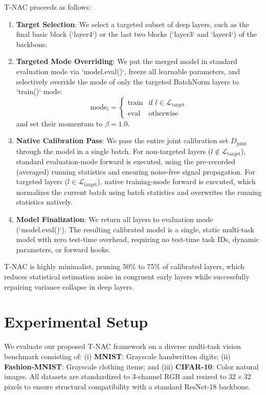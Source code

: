 \documentclass{article}
\theoremstyle{plain}
\theoremstyle{definition}
\begin{document}
T-NAC proceeds as follows:
\begin{enumerate}\setlength{\itemsep}{0pt}\setlength{\parskip}{0pt}
    \item \textbf{Target Selection}: We select a targeted subset of deep layers, such as the final basic block (`layer4`) or the last two blocks (`layer3` and `layer4`) of the backbone.
    \item \textbf{Targeted Mode Overriding}: We put the merged model in standard evaluation mode via `model.eval()`, freeze all learnable parameters, and selectively override the mode of only the targeted BatchNorm layers to `train()` mode:
    \begin{equation}
        \text{mode}_l = \begin{cases}
            \text{train} & \text{if } l \in \mathcal{L}_{\text{target}} \\
            \text{eval} & \text{otherwise}
        \end{cases}
    \end{equation}
    and set their momentum to $\beta=1.0$.
    \item \textbf{Native Calibration Pass}: We pass the entire joint calibration set $D_{\text{joint}}$ through the model in a single batch. For non-targeted layers ($l \notin \mathcal{L}_{\text{target}}$), standard evaluation-mode forward is executed, using the pre-recorded (averaged) running statistics and ensuring noise-free signal propagation. For targeted layers ($l \in \mathcal{L}_{\text{target}}$), native training-mode forward is executed, which normalizes the current batch using batch statistics and overwrites the running statistics natively.
    \item \textbf{Model Finalization}: We return all layers to evaluation mode (`model.eval()`). The resulting calibrated model is a single, static multi-task model with zero test-time overhead, requiring no test-time task IDs, dynamic parameters, or forward hooks.
\end{enumerate}

T-NAC is highly minimalist, pruning 50\% to 75\% of calibrated layers, which reduces statistical estimation noise in congruent early layers while successfully repairing variance collapse in deep layers.

\section{Experimental Setup}
\label{sec:experiments}
We evaluate our proposed T-NAC framework on a diverse multi-task vision benchmark consisting of: (i) \textbf{MNIST}: Grayscale handwritten digits; (ii) \textbf{Fashion-MNIST}: Grayscale clothing items; and (iii) \textbf{CIFAR-10}: Color natural images. All datasets are standardized to 3-channel RGB and resized to $32 \times 32$ pixels to ensure structural compatibility with a standard ResNet-18 backbone.
\end{document}
